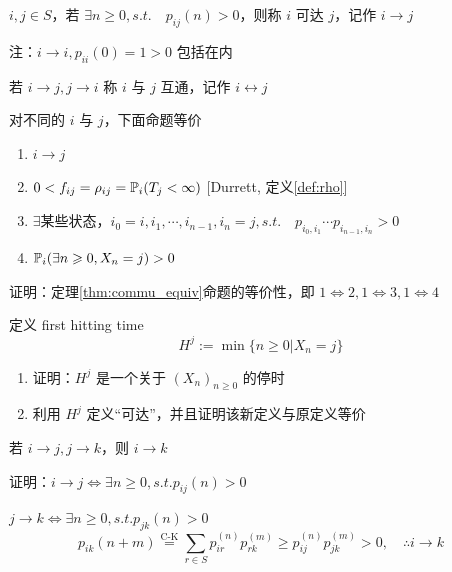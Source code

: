 \begin{definition}[可达]
    $i,j\in S$，若 $\exists n\geq 0, s.t.\quad p_{ij}(n)>0$，则称 $i$ 可达 $j$，记作 $i\to j$

    注：$i\to i,p_{ii}(0)=1>0$ 包括在内
\end{definition}

\begin{definition}[互通]
    若 $i\to j,j\to i$ 称 $i$ 与 $j$ 互通，记作 $i\leftrightarrow j$
\end{definition}

\begin{theorem}\label{thm:commu_equiv}
    对不同的 $i$ 与 $j$，下面命题等价
    \begin{enumerate}
        \item $i\to j$
        \item $0<f_{ij}=\rho_{ij}=\mathbb{P}_i(T_j<\infty)$ [Durrett\cite{durrett}, 定义\ref{def:rho}]
        \item $\exists$某些状态，$i_0=i,i_1,\cdots,i_{n-1},i_n=j,s.t.\quad p_{i_0,i_1}\cdots p_{i_{n-1},i_n}>0$
        \item $\mathbb{P}_i(\exists n\geqslant 0,X_n=j)>0$
    \end{enumerate}
\end{theorem}

\begin{problem}[作业6-1]
    证明：定理\ref{thm:commu_equiv}命题的等价性，即 $1\Leftrightarrow 2,1\Leftrightarrow 3, 1\Leftrightarrow 4$
\end{problem}

\begin{problem}[作业6-2]
    定义 first hitting time
    \[
    H^j:=\min\{n\geq 0|X_n=j\}
    \]
    \begin{enumerate}
        \item 证明：$H^j$ 是一个关于 $(X_n)_{n\geq 0}$ 的停时
        \item 利用 $H^j$ 定义“可达”，并且证明该新定义与原定义等价
    \end{enumerate}
\end{problem}

\begin{property}
    若 $i\to j,j\to k$，则 $i\to k$
\end{property}

证明：$i\to j\Leftrightarrow\exists n\geq 0,s.t. p_{ij}(n)>0$

$j\to k\Leftrightarrow\exists n\geq 0,s.t. p_{jk}(n)>0$
\[
p_{ik}(n+m)\overset{\text{C-K}}{=}\sum_{r\in S}p_{ir}^{(n)}p_{rk}^{(m)}\geq p_{ij}^{(n)}p_{jk}^{(m)}>0,\quad \therefore i\to k
\]

